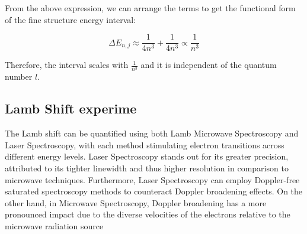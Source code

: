 \documentclass[11pt]{article}
\begin{document}
    From the above expression, we can arrange the terms to get the functional form of the fine structure energy interval:

    \begin{equation}
        \Delta E_{n,j} \approx \frac{1}{4n^3} + \frac{1}{4n^3} \propto \frac{1}{n^3}
    \end{equation}

    Therefore, the interval scales with $\frac{1}{n^3}$ and it is independent of the quantum number $l$.

    \subsection{Lamb Shift experime}

    The Lamb shift can be quantified using both Lamb Microwave Spectroscopy and Laser Spectroscopy, with each method 
    stimulating electron transitions across different energy levels. Laser Spectroscopy stands out for its greater 
    precision, attributed to its tighter linewidth and thus higher resolution in comparison to microwave techniques. 
    Furthermore, Laser Spectroscopy can employ Doppler-free saturated spectroscopy methods to counteract Doppler broadening 
    effects. On the other hand, in Microwave Spectroscopy, Doppler broadening has a more pronounced impact due to the diverse 
    velocities of the electrons relative to the microwave radiation source

    
    
    
\end{document}
